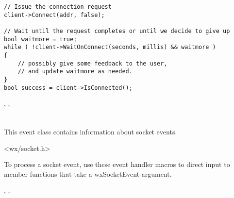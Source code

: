 \begin{verbatim}
// Issue the connection request
client->Connect(addr, false);

// Wait until the request completes or until we decide to give up
bool waitmore = true; 
while ( !client->WaitOnConnect(seconds, millis) && waitmore )
{
    // possibly give some feedback to the user,
    // and update waitmore as needed.
}
bool success = client->IsConnected();
\end{verbatim}


, 
, 

\section{}\label{wxsocketevent}

This event class contains information about socket events.




<wx/socket.h>


To process a socket event, use these event handler macros to direct input
to member functions that take a wxSocketEvent argument.

\twocolwidtha{7cm}
\begin{twocollist}\itemsep=0pt
\end{twocollist}


, 
, 


\label{wxsocketeventctor}


